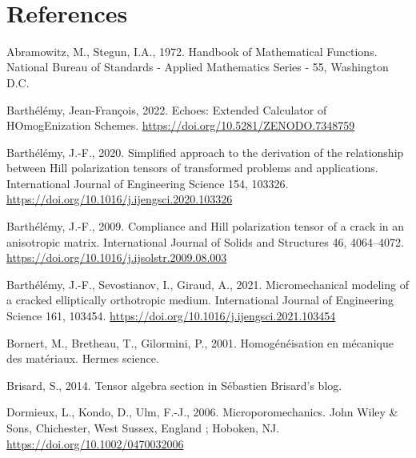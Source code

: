 \documentclass[
  letterpaper,
  DIV=11,
  numbers=noendperiod]{scrreprt}
\newlength{\cslhangindent}
\newlength{\cslentryspacingunit} %
\newenvironment{CSLReferences}[2] %
 {%
  \setlength{\parindent}{0pt}
  \ifodd #1
  \let\oldpar\par
  \def\par{\hangindent=\cslhangindent\oldpar}
  \fi
  \setlength{\parskip}{#2\cslentryspacingunit}
 }%
 {}
\begin{document}
\(\,\)


\hypertarget{references}{%
\chapter*{References}\label{references}}


\hypertarget{refs}{}
\begin{CSLReferences}{1}{0}
\leavevmode{}%
Abramowitz, M., Stegun, I.A., 1972. Handbook of {Mathematical
Functions}. {National Bureau of Standards - Applied Mathematics Series -
55}, {Washington D.C.}

\leavevmode{}%
Barthélémy, Jean-François, 2022. Echoes: {Extended Calculator} of
{HOmogEnization Schemes}. \url{https://doi.org/10.5281/ZENODO.7348759}

\leavevmode{}%
Barthélémy, J.-F., 2020. Simplified approach to the derivation of the
relationship between {Hill} polarization tensors of transformed problems
and applications. International Journal of Engineering Science 154,
103326. \url{https://doi.org/10.1016/j.ijengsci.2020.103326}

\leavevmode{}%
Barthélémy, J.-F., 2009. Compliance and {Hill} polarization tensor of a
crack in an anisotropic matrix. International Journal of Solids and
Structures 46, 4064--4072.
\url{https://doi.org/10.1016/j.ijsolstr.2009.08.003}

\leavevmode{}%
Barthélémy, J.-F., Sevostianov, I., Giraud, A., 2021. Micromechanical
modeling of a cracked elliptically orthotropic medium. International
Journal of Engineering Science 161, 103454.
\url{https://doi.org/10.1016/j.ijengsci.2021.103454}

\leavevmode{}%
Bornert, M., Bretheau, T., Gilormini, P., 2001. Homogénéisation en
mécanique des matériaux. {Hermes science}.

\leavevmode{}%
Brisard, S., 2014. Tensor algebra section in {Sébastien Brisard}'s blog.

\leavevmode{}%
Dormieux, L., Kondo, D., Ulm, F.-J., 2006. Microporomechanics. {John
Wiley \& Sons}, {Chichester, West Sussex, England ; Hoboken, NJ}.
\url{https://doi.org/10.1002/0470032006}


\end{CSLReferences}
\end{document}
